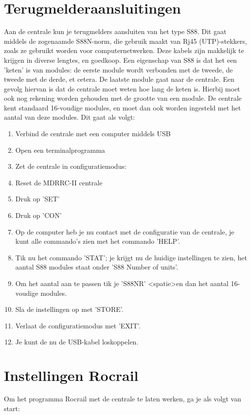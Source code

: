 \documentclass[12pt,a4paper]{report}
\begin{document}
\chapter{Terugmelderaansluitingen}
Aan de centrale kun je terugmelders aansluiten van het type S88. Dit gaat middels de zogenaamde S88N-norm, die gebruik maakt van Rj45 (UTP)-stekkers, zoals ze gebruikt worden voor computernetwerken. Deze kabels zijn makkelijk te krijgen in diverse lengtes, en goedkoop.
Een eigenschap van S88 is dat het een 'keten' is van modules: de eerste module wordt verbonden met de tweede, de tweede met de derde, et cetera. De laatste module gaat naar de centrale. Een gevolg hiervan is dat de centrale moet weten hoe lang de keten is. Hierbij moet ook nog rekening worden gehouden met de grootte van een module. De centrale kent standaard 16-voudige modules, en moet dan ook worden ingesteld met het aantal van deze modules.
Dit gaat als volgt: 
\begin{enumerate}
\item Verbind de centrale met een computer middels USB
\item Open een terminalprogramma
\item Zet de centrale in configuratiemodus: 
\item Reset de MDRRC-II centrale
\item Druk op 'SET'
\item Druk op 'CON'
\item Op de computer heb je nu contact met de configuratie van de centrale, je kunt alle commando's zien met het commando 'HELP'.
\item Tik nu het commando 'STAT'; je krijgt nu de huidige instellingen te zien, het aantal S88 modules staat onder 'S88 Number of units'.
\item Om het aantal aan te passen tik je 'S88NR' \textless spatie\textgreater en dan het aantal 16-voudige modules.
\item Sla de instellingen op met 'STORE'.
\item Verlaat de configuratiemodus met 'EXIT'.
\item Je kunt de nu de USB-kabel loskoppelen.
\end{enumerate}

\chapter{Instellingen Rocrail}
Om het programma Rocrail met de centrale te laten werken, ga je als volgt van start:
\end{document}
